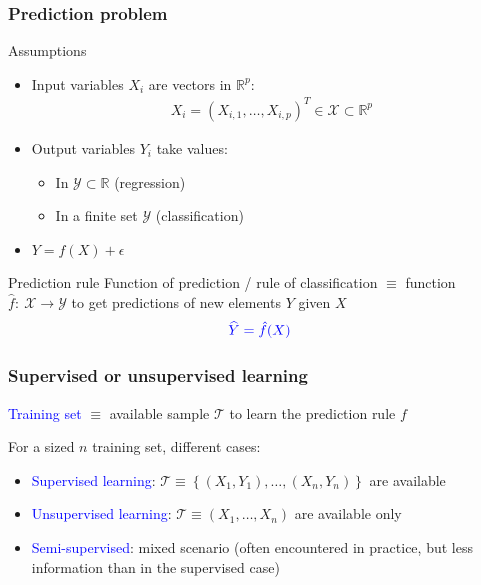 \documentclass[pressentation,9pt,aspectratio=1610,xcolor=table]{beamer}
\newcommand{\structuretext}[1]{{\textcolor{blue}{#1}}}
\begin{document}
\begin{frame}
  \frametitle{Prediction problem}
  \begin{block}{Assumptions}
    \begin{itemize}
    \item Input variables $X_i$ are vectors in $\mathbb{R}^p$:
      \begin{align*}
        X_i= \left(X_{i,1}, \ldots, X_{i,p} \right)^T \in \mathcal{X} \subset \mathbb{R}^p
      \end{align*}
    \item Output variables $Y_i$ take values:
      \begin{itemize}
      \item In $\mathcal{Y \subset \mathbb{R}}$ (regression)
      \item In a finite set $\mathcal{Y}$ (classification)
      \end{itemize}
    \item \(Y = f(X) + \epsilon\)
    \end{itemize}
  \end{block}
  \begin{block}{Prediction rule}
    Function of prediction / rule of classification $\equiv$ function $\hat{f}: \  \mathcal{X} \rightarrow \mathcal{Y}$  to  
    get  predictions of new elements $Y$ given $X$
     $$\structuretext{\widehat{Y}=\hat{f}(X)}$$
  \end{block}
\end{frame}

\begin{frame}
  \frametitle{Supervised or unsupervised learning}

  \structuretext{Training set} $\equiv$ available sample  $\mathcal{T}$ to learn the prediction rule $f$ \medskip 
  
  For a sized $n$ training set, different cases:
  \begin{itemize}
  \item \structuretext{Supervised learning}:  $ \mathcal{T} \equiv \left\{ (X_1,Y_1), \ldots, (X_n,Y_n) \right\}$ are available
  \item \structuretext{Unsupervised learning}: $ \mathcal{T} \equiv \left( X_1, \ldots, X_n \right)$ are available only 
  \item \structuretext{Semi-supervised}: mixed scenario (often encountered in practice, but less information than in the supervised case)
  \end{itemize} 
\end{frame}
\end{document}
